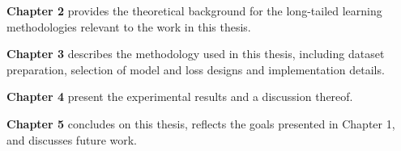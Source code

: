 \noindent \textbf{Chapter 2} provides the theoretical background for the long-tailed learning methodologies relevant to the work in this thesis.
\vspace{1em}

\noindent \textbf{Chapter 3} describes the methodology used in this thesis, including dataset preparation, selection of model and loss designs and implementation details. 
\vspace{1em}

\noindent \textbf{Chapter 4} present the experimental results and a discussion thereof.
\vspace{1em}

\noindent \textbf{Chapter 5} concludes on this thesis, reflects the goals presented in Chapter 1, and discusses future work. 

